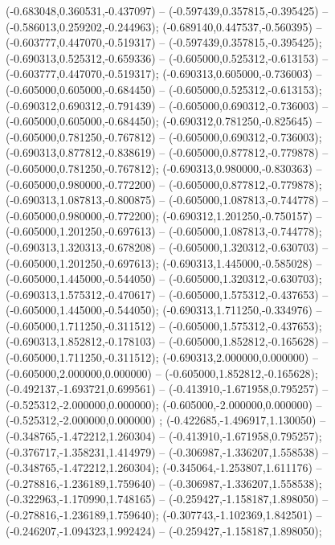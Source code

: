 (-0.683048,0.360531,-0.437097) -- (-0.597439,0.357815,-0.395425) -- (-0.586013,0.259202,-0.244963);
 (-0.689140,0.447537,-0.560395) -- (-0.603777,0.447070,-0.519317) -- (-0.597439,0.357815,-0.395425);
 (-0.690313,0.525312,-0.659336) -- (-0.605000,0.525312,-0.613153) -- (-0.603777,0.447070,-0.519317);
 (-0.690313,0.605000,-0.736003) -- (-0.605000,0.605000,-0.684450) -- (-0.605000,0.525312,-0.613153);
 (-0.690312,0.690312,-0.791439) -- (-0.605000,0.690312,-0.736003) -- (-0.605000,0.605000,-0.684450);
 (-0.690312,0.781250,-0.825645) -- (-0.605000,0.781250,-0.767812) -- (-0.605000,0.690312,-0.736003);
 (-0.690313,0.877812,-0.838619) -- (-0.605000,0.877812,-0.779878) -- (-0.605000,0.781250,-0.767812);
 (-0.690313,0.980000,-0.830363) -- (-0.605000,0.980000,-0.772200) -- (-0.605000,0.877812,-0.779878);
 (-0.690313,1.087813,-0.800875) -- (-0.605000,1.087813,-0.744778) -- (-0.605000,0.980000,-0.772200);
 (-0.690312,1.201250,-0.750157) -- (-0.605000,1.201250,-0.697613) -- (-0.605000,1.087813,-0.744778);
 (-0.690313,1.320313,-0.678208) -- (-0.605000,1.320312,-0.630703) -- (-0.605000,1.201250,-0.697613);
 (-0.690313,1.445000,-0.585028) -- (-0.605000,1.445000,-0.544050) -- (-0.605000,1.320312,-0.630703);
 (-0.690313,1.575312,-0.470617) -- (-0.605000,1.575312,-0.437653) -- (-0.605000,1.445000,-0.544050);
 (-0.690313,1.711250,-0.334976) -- (-0.605000,1.711250,-0.311512) -- (-0.605000,1.575312,-0.437653);
 (-0.690313,1.852812,-0.178103) -- (-0.605000,1.852812,-0.165628) -- (-0.605000,1.711250,-0.311512);
 (-0.690313,2.000000,0.000000) -- (-0.605000,2.000000,0.000000) -- (-0.605000,1.852812,-0.165628);
 (-0.492137,-1.693721,0.699561) -- (-0.413910,-1.671958,0.795257) -- (-0.525312,-2.000000,0.000000);
 (-0.605000,-2.000000,0.000000) -- (-0.525312,-2.000000,0.000000) ;
 (-0.422685,-1.496917,1.130050) -- (-0.348765,-1.472212,1.260304) -- (-0.413910,-1.671958,0.795257);
 (-0.376717,-1.358231,1.414979) -- (-0.306987,-1.336207,1.558538) -- (-0.348765,-1.472212,1.260304);
 (-0.345064,-1.253807,1.611176) -- (-0.278816,-1.236189,1.759640) -- (-0.306987,-1.336207,1.558538);
 (-0.322963,-1.170990,1.748165) -- (-0.259427,-1.158187,1.898050) -- (-0.278816,-1.236189,1.759640);
 (-0.307743,-1.102369,1.842501) -- (-0.246207,-1.094323,1.992424) -- (-0.259427,-1.158187,1.898050);
